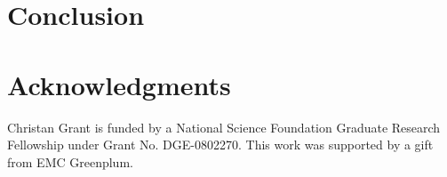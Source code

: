 \documentclass[11pt,letterpaper]{article}
\begin{document}

\section{Conclusion}

\section*{Acknowledgments}
Christan Grant is funded by a National
Science Foundation Graduate Research Fellowship under Grant No. DGE-0802270.
This work was supported by a gift from EMC Greenplum.


%

\end{document}
